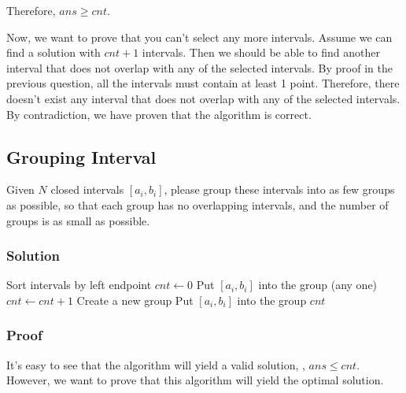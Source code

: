 \documentclass{article}
\begin{document}
Therefore, $ans \ge cnt$.

Now, we want to prove that you can't select any more intervals. Assume we can find a solution with $cnt + 1$ intervals. Then we should be able to find another interval that does not overlap with any of the selected intervals. By proof in the previous question, all the intervals must contain at least 1 point. Therefore, there doesn't exist any interval that does not overlap with any of the selected intervals. By contradiction, we have proven that the algorithm is correct.

\subsection{Grouping Interval}

Given $N$ closed intervals $[a_i,b_i]$, please group these intervals into as few groups as possible, so that each group has no overlapping intervals, and the number of groups is as small as possible.

\subsubsection{Solution}

\begin{algorithm}[H]
    \BlankLine
    Sort intervals by left endpoint\;
    $cnt \gets 0$\;
    {
        {
            Put $[a_i,b_i]$ into the group (any one)\;
        }
        \Else
        {
            $cnt \gets cnt + 1$\;
            Create a new group\;
            Put $[a_i,b_i]$ into the group\;
        }
    }
    \Return $cnt$\;
\end{algorithm}

\subsubsection{Proof}

It's easy to see that the algorithm will yield a valid solution, \ie, $ans \le cnt$. However, we want to prove that this algorithm will yield the optimal solution.
\end{document}

